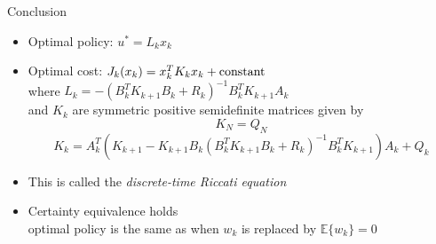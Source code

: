 Conclusion
\begin{itemize}
    \item Optimal policy: $u^*=L_kx_k$
    \item Optimal cost: $J_k(x_k)=x_k^TK_kx_k+\text{\rm constant}$\\
    where $L_k=-(B_k^TK_{k+1}B_k+R_k)^{-1}B_k^TK_{k+1}A_k$\\
    and $K_k$ are symmetric positive semidefinite matrices given by 
    \[K_N = Q_N\]
    \[K_k = A_k^T(K_{k+1}-K_{k+1}B_k(B_k^TK_{k+1}B_k+R_k)^{-1}B_k^TK_{k+1})A_k+Q_k\]

    \item This is called the \emph{discrete-time Riccati equation}
    \item Certainty equivalence holds \\ optimal policy is the same as when $w_k$ is replaced by $\mathbb{E}\{ w_k \}=0$ 
\end{itemize}

